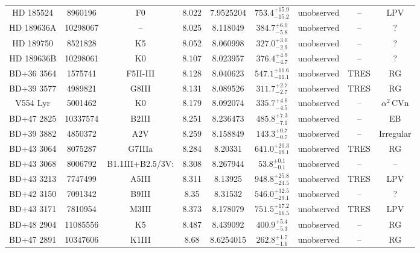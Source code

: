 \begin{table*}
\begin{tabular}{ccccccccc}
HD 185524 & 8960196 & F0 & 8.022 & 7.9525204 & $753.4^{+15.9}_{-15.2}$ & unobserved & -- & LPV \\
HD 189636A & 10298067 & -- & 8.025 & 8.118049 & $384.7^{+6.0}_{-5.8}$ & unobserved & -- & ? \\
HD 189750 & 8521828 & K5 & 8.052 & 8.060998 & $327.0^{+3.0}_{-2.9}$ & unobserved & -- & ? \\
HD 189636B & 10298061 & K0 & 8.107 & 8.023957 & $376.4^{+4.9}_{-4.7}$ & unobserved & -- & ? \\
BD+36 3564 & 1575741 & F5II-III & 8.128 & 8.040623 & $547.1^{+11.6}_{-11.1}$ & unobserved & TRES & RG \\
BD+39 3577 & 4989821 & G8III & 8.131 & 8.089526 & $311.7^{+2.7}_{-2.7}$ & unobserved & TRES & RG \\
V554 Lyr & 5001462 & K0 & 8.179 & 8.092074 & $335.7^{+4.6}_{-4.5}$ & unobserved & -- & $\alpha^2\,\text{CVn}$ \\
BD+47 2825 & 10337574 & B2III & 8.251 & 8.236473 & $485.8^{+7.3}_{-7.1}$ & unobserved & -- & EB \\
BD+39 3882 & 4850372 & A2V & 8.259 & 8.158849 & $143.3^{+0.7}_{-0.7}$ & unobserved & -- & Irregular \\
BD+43 3064 & 8075287 & G7IIIa & 8.284 & 8.20331 & $641.0^{+20.3}_{-19.1}$ & unobserved & TRES & RG \\
BD+43 3068 & 8006792 & B1.1III+B2.5/3V: & 8.308 & 8.267944 & $53.8^{+0.1}_{-0.1}$ & unobserved & -- & -- \\
BD+43 3213 & 7747499 & A5III & 8.311 & 8.13925 & $948.8^{+25.8}_{-24.5}$ & unobserved & TRES & LPV \\
BD+42 3150 & 7091342 & B9III & 8.35 & 8.31532 & $546.0^{+32.5}_{-29.1}$ & unobserved & -- & ? \\
BD+43 3171 & 7810954 & M3III & 8.373 & 8.178079 & $751.5^{+17.2}_{-16.5}$ & unobserved & TRES & LPV \\
BD+48 2904 & 11085556 & K5 & 8.487 & 8.439092 & $400.9^{+5.4}_{-5.3}$ & unobserved & -- & RG \\
BD+47 2891 & 10347606 & K1III & 8.68 & 8.6254015 & $262.8^{+1.7}_{-1.6}$ & unobserved & -- & RG \\
\hline
\end{tabular}
\end{table*}
